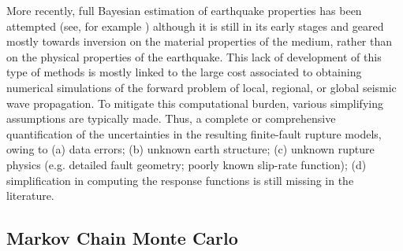 


 \noindent More recently,  full Bayesian estimation of earthquake  properties has been attempted (see, for example \cite{minson2013bayesian,bui2013computational}) although it is still in its early stages and geared mostly towards inversion on the material properties of the medium, rather than on the physical properties of the earthquake.  This lack of development of this type of methods is mostly linked to the large cost associated to obtaining numerical simulations of the  forward problem of local, regional, or global seismic wave propagation. To mitigate this computational burden, various simplifying assumptions are typically made. Thus, a complete or comprehensive quantification of the uncertainties in the resulting finite-fault rupture models, owing to (a) data errors; (b) unknown earth structure; (c) unknown rupture physics (e.g. detailed fault geometry; poorly known slip-rate function); (d) simplification in computing the response functions is still missing in the literature. 
 
 \subsection{Markov Chain Monte Carlo}

